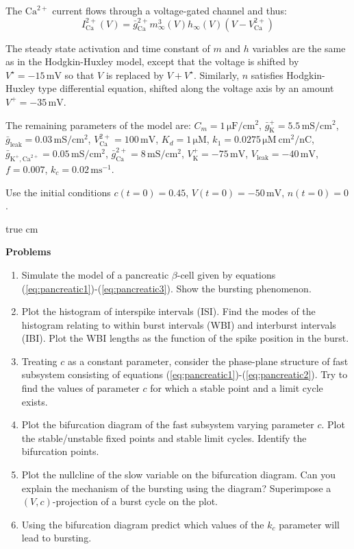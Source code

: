 \documentclass[12pt]{article}
\newcommand{\units}[1]{\mathrm{#1}}
\newcommand{\K}{\text{K}^+}
\newcommand{\Ca}{\text{Ca}^{2+}}
\newcommand{\Leak}{\text{leak}}
\begin{document}
  The $\Ca$ current flows through a voltage-gated channel and thus:
\begin{equation}
I_\Ca(V)=\bar{g}_\Ca m_\infty^3(V)h_\infty(V)(V-V_\Ca)
\end{equation}

The steady state activation and time constant of $m$ and $h$ variables
are the same as in the Hodgkin-Huxley model, except that the voltage is
shifted by $V^\star=-15\,\units{mV}$ so that $V$ is replaced by
$V+V^\star$. Similarly, $n$ satisfies Hodgkin-Huxley type differential equation, shifted along the voltage axis by an amount $V^+=-35\,\units{mV}$.

The remaining parameters of the model are: $C_m=1\,\units{\mu
F/cm^2}$, $\bar{g}_\K=5.5\,\units{mS/cm^2}$,
$\bar{g}_\Leak=0.03\,\mathrm{mS/cm^2}$, $V_\Ca=100\,\units{mV}$,
$K_d=1\,\units{\mu M}$, $k_1=0.0275\,\units{\mu M\:cm^2/nC}$,
$\bar{g}_{\K,\Ca}=0.05\,\units{mS/cm^2}$,
$\bar{g}_\Ca=8\,\units{mS/cm^2}$, $V_\K=-75\,\units{mV}$,
$V_\Leak=-40\,\units{mV}$, $f=0.007$, $k_c=0.02\,\units{ms^{-1}}$.

Use the initial conditions $c(t=0)=0.45$, $V(t=0)=-50\,\units{mV}$, $n(t=0)=0$.

 true cm

{\bf Problems}


\begin{enumerate}
    \item Simulate the model of a pancreatic $\beta$-cell given
        by equations (\ref{eq:pancreatic1})-(\ref{eq:pancreatic3}).
        Show the bursting phenomenon.
    \item Plot the histogram of interspike intervals (ISI). Find the modes
        of the histogram relating to within burst intervals (WBI) and
        interburst intervals (IBI). Plot the WBI lengths as the
        function of the spike position in the burst.
    \item Treating $c$ as a constant parameter, consider the
        phase-plane structure of fast
        subsystem consisting of equations
        (\ref{eq:pancreatic1})-(\ref{eq:pancreatic2}). Try to find the
        values of parameter $c$ for which a stable point and a limit
        cycle exists.
    \item Plot the bifurcation diagram of the fast subsystem
        varying parameter $c$. Plot the stable/unstable fixed points
        and stable limit cycles. Identify the bifurcation points. 
    \item Plot the nullcline of the slow variable on the bifurcation
        diagram. Can you explain the mechanism of the bursting using
        the diagram? Superimpose a $(V,c)$-projection of a burst cycle on the plot.
    \item Using the bifurcation diagram predict which values of the $k_c$
        parameter will lead to bursting. 
\end{enumerate}
\end{document}
